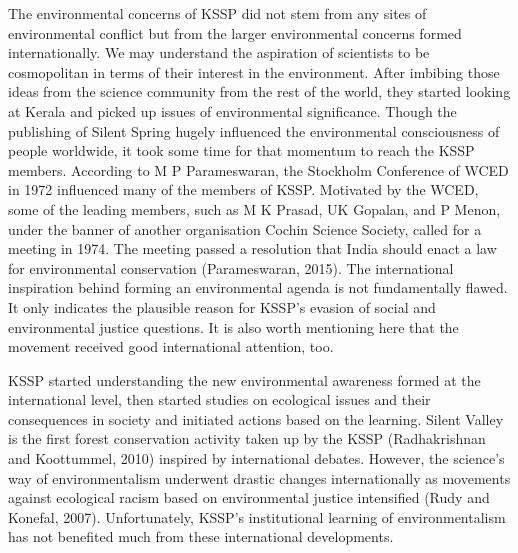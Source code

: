 \documentclass[twoside, 13pt]{article}
\begin{document}
{{{{\fontsize{12}{14}\selectfont
The environmental concerns of KSSP did not stem from any sites of environmental conflict but from the larger environmental concerns formed internationally. We may understand the aspiration of scientists to be cosmopolitan in terms of their interest in the environment. After imbibing those ideas from the science community from the rest of the world, they started looking at Kerala and picked up issues of environmental significance. Though the publishing of Silent Spring hugely influenced the environmental consciousness of people worldwide, it took some time for that momentum to reach the KSSP members. According to M P Parameswaran, the Stockholm Conference of WCED in 1972 influenced many of the members of KSSP. Motivated by the WCED, some of the leading members, such as M K Prasad, UK Gopalan, and P Menon, under the banner of another organisation Cochin Science Society, called for a meeting in 1974. The meeting passed a resolution that India should enact a law for environmental conservation (Parameswaran, 2015). The international inspiration behind forming an environmental agenda is not fundamentally flawed. It only indicates the plausible reason for KSSP’s evasion of social and environmental justice questions. It is also worth mentioning here that the movement received good international attention, too.

\newpage

KSSP started understanding the new environmental awareness formed at the international level, then started studies on ecological issues and their consequences in society and initiated actions based on the learning. Silent Valley is the first forest conservation activity taken up by the KSSP (Radhakrishnan and Koottummel, 2010) inspired by international debates. However, the science’s way of environmentalism underwent drastic changes internationally as movements against ecological racism based on environmental justice intensified (Rudy and Konefal, 2007). Unfortunately, KSSP's institutional learning of environmentalism has not benefited much from these international developments.} 

}}}
\end{document}
